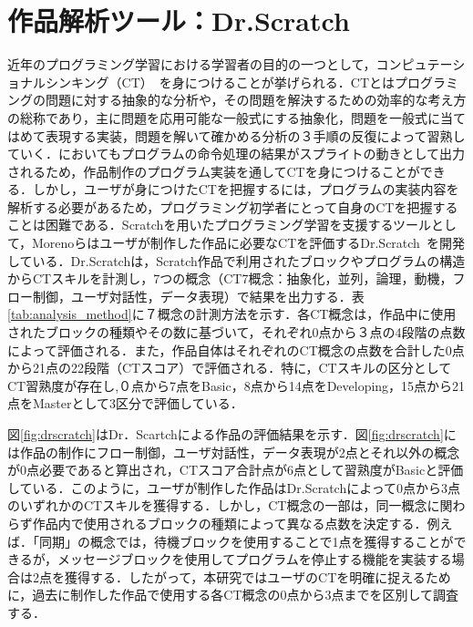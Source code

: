 \documentclass[11pt,dvipdfmx]{jreport}
\begin{document}
\section{作品解析ツール：Dr.Scratch}
近年のプログラミング学習における学習者の目的の一つとして，コンピュテーショナルシンキング（CT）~\cite{Wing_2006}を身につけることが挙げられる．CTとはプログラミングの問題に対する抽象的な分析や，その問題を解決するための効率的な考え方の総称であり，主に問題を応用可能な一般式にする抽象化，問題を一般式に当てはめて表現する実装，問題を解いて確かめる分析の３手順の反復によって習熟していく．においてもプログラムの命令処理の結果がスプライトの動きとして出力されるため，作品制作のプログラム実装を通してCTを身につけることができる．しかし，ユーザが身につけたCTを把握するには，プログラムの実装内容を解析する必要があるため，プログラミング初学者にとって自身のCTを把握することは困難である．Scratchを用いたプログラミング学習を支援するツールとして，Morenoらはユーザが制作した作品に必要なCTを評価するDr.Scratch~\cite{Moreno_2015}を開発している．Dr.Scratchは，Scratch作品で利用されたブロックやプログラムの構造からCTスキルを計測し，7つの概念（CT7概念：抽象化，並列，論理，動機，フロー制御，ユーザ対話性，データ表現）で結果を出力する．表\ref{tab:analysis_method}に７概念の計測方法を示す．各CT概念は，作品中に使用されたブロックの種類やその数に基づいて，それぞれ0点から３点の4段階の点数によって評価される．また，作品自体はそれぞれのCT概念の点数を合計した0点から21点の22段階（CTスコア）で評価される．特に，CTスキルの区分としてCT習熟度が存在し,０点から7点をBasic，8点から14点をDeveloping，15点から21点をMasterとして3区分で評価している．

図\ref{fig:drscratch}はDr．Scartchによる作品の評価結果を示す．図\ref{fig:drscratch}には作品の制作にフロー制御，ユーザ対話性，データ表現が2点とそれ以外の概念が0点必要であると算出され，CTスコア合計点が6点として習熟度がBasicと評価している．このように，ユーザが制作した作品はDr.Scratchによって0点から3点のいずれかのCTスキルを獲得する．しかし，CT概念の一部は，同一概念に関わらず作品内で使用されるブロックの種類によって異なる点数を決定する．例えば．「同期」の概念では，待機ブロックを使用することで1点を獲得することができるが，メッセージブロックを使用してプログラムを停止する機能を実装する場合は2点を獲得する．したがって，本研究ではユーザのCTを明確に捉えるために，過去に制作した作品で使用する各CT概念の0点から3点までを区別して調査する．
\end{document}
